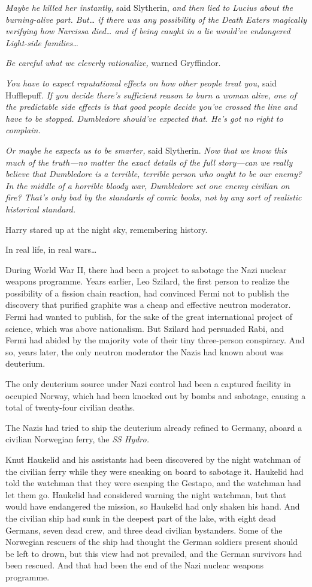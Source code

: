 \emph{Maybe he killed her instantly,} said Slytherin, \emph{and then lied to Lucius about the burning-alive part. But{\ldots} if there was \emph{any} possibility of the Death Eaters magically verifying how Narcissa died{\ldots} and if being caught in a lie would've endangered Light-side families{\ldots}}

\emph{Be careful what we cleverly rationalize,} warned Gryffindor.

\emph{You have to expect reputational effects on how other people treat you,} said Hufflepuff. \emph{If you decide there's sufficient reason to burn a woman alive, one of the predictable side effects is that good people decide you've crossed the line and have to be stopped. Dumbledore should've expected that. He's got no right to complain.}

\emph{Or maybe he expects us to be smarter,} said Slytherin. \emph{Now that we know this much of the truth—no matter the exact details of the full story—can we really believe that Dumbledore is a terrible, terrible person who ought to be our enemy? In the middle of a horrible bloody war, Dumbledore set \emph{one} enemy civilian on fire? That's only bad by the standards of comic books, not by any sort of realistic historical standard.}

Harry stared up at the night sky, remembering history.

In real life, in real wars{\ldots}

During World War II, there had been a project to sabotage the Nazi nuclear weapons programme. Years earlier, Leo Szilard, the first person to realize the possibility of a fission chain reaction, had convinced Fermi not to publish the discovery that purified graphite was a cheap and effective neutron moderator. Fermi had wanted to publish, for the sake of the great international project of science, which was above nationalism. But Szilard had persuaded Rabi, and Fermi had abided by the majority vote of their tiny three-person conspiracy. And so, years later, the only neutron moderator the Nazis had known about was deuterium.

The only deuterium source under Nazi control had been a captured facility in occupied Norway, which had been knocked out by bombs and sabotage, causing a total of twenty-four civilian deaths.

The Nazis had tried to ship the deuterium already refined to Germany, aboard a civilian Norwegian ferry, the \emph{SS Hydro.}

Knut Haukelid and his assistants had been discovered by the night watchman of the civilian ferry while they were sneaking on board to sabotage it. Haukelid had told the watchman that they were escaping the Gestapo, and the watchman had let them go. Haukelid had considered warning the night watchman, but that would have endangered the mission, so Haukelid had only shaken his hand. And the civilian ship had sunk in the deepest part of the lake, with eight dead Germans, seven dead crew, and three dead civilian bystanders. Some of the Norwegian rescuers of the ship had thought the German soldiers present should be left to drown, but this view had not prevailed, and the German survivors had been rescued. And that had been the end of the Nazi nuclear weapons programme.

